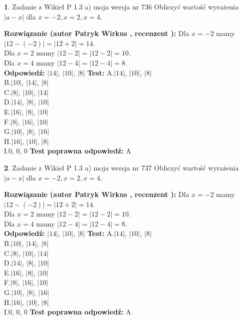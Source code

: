 \documentclass[12pt, a4paper]{article}
\theoremstyle{definition} %
\newtheorem{zad}{}
\newcommand{\zadStart}[1]{\begin{zad}#1\newline}
\newcommand{\zadStop}{\end{zad}}
\newcommand{\rozwStart}[2]{\noindent \textbf{Rozwiązanie (autor #1 , recenzent #2): }\newline}
\newcommand{\rozwStop}{\newline}
\newcommand{\odpStart}{\noindent \textbf{Odpowiedź:}\newline}
\newcommand{\odpStop}{\newline}
\newcommand{\testStart}{\noindent \textbf{Test:}\newline}
\newcommand{\testStop}{\newline}
\newcommand{\kluczStart}{\noindent \textbf{Test poprawna odpowiedź:}\newline}
\newcommand{\kluczStop}{\newline}
\begin{document}
\zadStart{Zadanie z Wikieł P 1.3 a) moja wersja nr 736}
Obliczyć wartość wyrażenia $|a - x|$ dla $x=-2,x=2,x=4$.
\zadStop
\rozwStart{Patryk Wirkus}{}
Dla $x = -2$ mamy $|12 - (-2)| = |12 + 2| = 14$.\\
Dla $x = 2$ mamy $|12 - 2| = |12 - 2| = 10$.\\
Dla $x = 4$ mamy $|12 - 4| = |12 - 4| = 8$.\\
\rozwStop
\odpStart
$|14|$, $|10|$, $|8|$
\odpStop
\testStart
A.$|14|$, $|10|$, $|8|$\\
B.$|10|$, $|14|$, $|8|$\\
C.$|8|$, $|10|$, $|14|$\\
D.$|14|$, $|8|$, $|10|$\\
E.$|16|$, $|8|$, $|10|$\\
F.$|8|$, $|16|$, $|10|$\\
G.$|10|$, $|8|$, $|16|$\\
H.$|16|$, $|10|$, $|8|$\\
I.$0$, $0$, $0$
\testStop
\kluczStart
A
\kluczStop



\zadStart{Zadanie z Wikieł P 1.3 a) moja wersja nr 737}
Obliczyć wartość wyrażenia $|a - x|$ dla $x=-2,x=2,x=4$.
\zadStop
\rozwStart{Patryk Wirkus}{}
Dla $x = -2$ mamy $|12 - (-2)| = |12 + 2| = 14$.\\
Dla $x = 2$ mamy $|12 - 2| = |12 - 2| = 10$.\\
Dla $x = 4$ mamy $|12 - 4| = |12 - 4| = 8$.\\
\rozwStop
\odpStart
$|14|$, $|10|$, $|8|$
\odpStop
\testStart
A.$|14|$, $|10|$, $|8|$\\
B.$|10|$, $|14|$, $|8|$\\
C.$|8|$, $|10|$, $|14|$\\
D.$|14|$, $|8|$, $|10|$\\
E.$|16|$, $|8|$, $|10|$\\
F.$|8|$, $|16|$, $|10|$\\
G.$|10|$, $|8|$, $|16|$\\
H.$|16|$, $|10|$, $|8|$\\
I.$0$, $0$, $0$
\testStop
\kluczStart
A
\kluczStop
\end{document}
